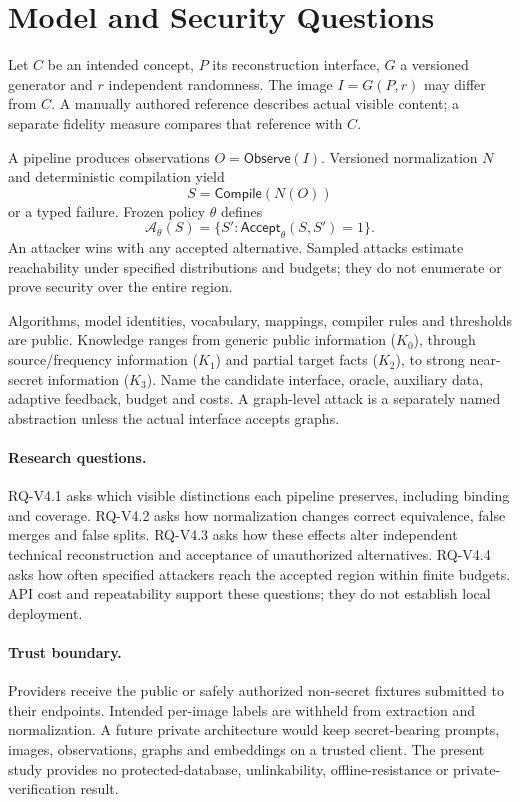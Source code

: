 \documentclass[compsoc,conference,a4paper,10pt,times]{IEEEtran}
\begin{document}
\section{Model and Security Questions}
\label{sec:model}
Let $C$ be an intended concept, $P$ its reconstruction interface, $G$ a versioned generator and $r$ independent randomness. The image $I=G(P,r)$ may differ from $C$. A manually authored reference describes actual visible content; a separate fidelity measure compares that reference with $C$.

A pipeline produces observations $O=\mathsf{Observe}(I)$. Versioned normalization $N$ and deterministic compilation yield
\begin{equation}
 S=\mathsf{Compile}(N(O))
\end{equation}
or a typed failure. Frozen policy $\theta$ defines
\begin{equation}
 \mathcal{A}_{\theta}(S)=\{S':\mathsf{Accept}_{\theta}(S,S')=1\}.
\end{equation}
An attacker wins with any accepted alternative. Sampled attacks estimate reachability under specified distributions and budgets; they do not enumerate or prove security over the entire region.

Algorithms, model identities, vocabulary, mappings, compiler rules and thresholds are public. Knowledge ranges from generic public information ($K_0$), through source/frequency information ($K_1$) and partial target facts ($K_2$), to strong near-secret information ($K_3$). Name the candidate interface, oracle, auxiliary data, adaptive feedback, budget and costs. A graph-level attack is a separately named abstraction unless the actual interface accepts graphs.

\paragraph{Research questions.}
RQ-V4.1 asks which visible distinctions each pipeline preserves, including binding and coverage. RQ-V4.2 asks how normalization changes correct equivalence, false merges and false splits. RQ-V4.3 asks how these effects alter independent technical reconstruction and acceptance of unauthorized alternatives. RQ-V4.4 asks how often specified attackers reach the accepted region within finite budgets. API cost and repeatability support these questions; they do not establish local deployment.

\paragraph{Trust boundary.}
Providers receive the public or safely authorized non-secret fixtures submitted to their endpoints. Intended per-image labels are withheld from extraction and normalization. A future private architecture would keep secret-bearing prompts, images, observations, graphs and embeddings on a trusted client. The present study provides no protected-database, unlinkability, offline-resistance or private-verification result.
\end{document}
